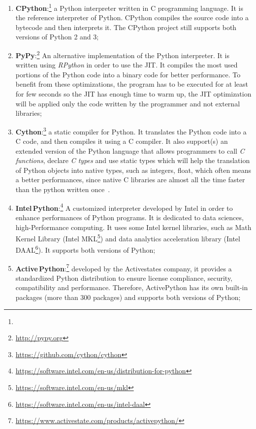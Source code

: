 \begin{enumerate}
    \item \textbf{CPython}:\footnote{} a Python interpreter written in C programming language. It is the reference interpreter of Python. CPython compiles the source code into a bytecode and then interprets it. The CPython project still supports both versions of Python 2 and 3;
    \item \textbf{PyPy}:\footnote{\url{http://pypy.org}} An alternative implementation of the Python interpreter. It is written using \emph{RPython} in order to use the JIT. It compiles the most used portions of the Python code into a binary code for better performance. To benefit from these optimizations, the program has to be executed for at least for few seconds so the JIT has enough time to warm up, the JIT optimization will be applied only the code written by the programmer and not external libraries;
    \item \textbf{Cython}:\footnote{\url{https://github.com/cython/cython}} a static compiler for Python. It translates the Python code into a C code, and then compiles it using a C compiler. It also support(s) an extended version of the Python language that allows programmers to call \emph{C functions}, declare \emph{C types} and use static types which will help the translation of Python objects into native types, such as integers, float, which often means a better performances, since native C libraries are almost all the time faster than the python written once~\cite{pereira_energy_2017}.
    \item \textbf{Intel\,Python}:\footnote{\url{https://software.intel.com/en-us/distribution-for-python}} A customized interpreter developed by Intel in order to enhance performances of Python programs. It is dedicated to data sciences, high-Performance computing. It uses some Intel kernel libraries, such as Math Kernel Library (Intel MKL\footnote{\url{https://software.intel.com/en-us/mkl}}) and data analytics acceleration library (Intel DAAL\footnote{\url{https://software.intel.com/en-us/intel-daal}}). It supports both versions of Python;
    \item \textbf{Active\,Python}:\footnote{\url{https://www.activestate.com/products/activepython/}} developed by the Activestates company, it provides a standardized Python distribution to ensure license compliance, security, compatibility and performance. Therefore, ActivePython has its own built-in packages (more than 300 packages) and supports both versions of Python;

\end{enumerate}
